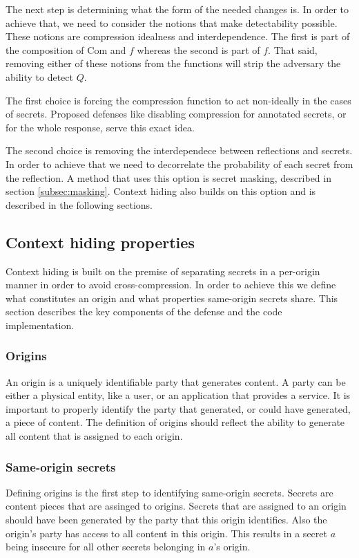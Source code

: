 \documentclass[conference, letterpaper, 10pt]{IEEEtran}
\begin{document}
The next step is determining what the form of the needed changes is. In order to
achieve that, we need to consider the notions that make detectability possible.
These notions are compression idealness and interdependence. The first is part
of the composition of $\textrm{Com}$ and $f$ whereas the second is part of $f$. That
said, removing either of these notions from the functions will strip the
adversary the ability to detect $Q$.

The first choice is forcing the compression function to act non-ideally in the
cases of secrets. Proposed defenses like disabling compression for annotated
secrets, or for the whole response, serve this exact idea.

The second choice is removing the interdependece between reflections and
secrets. In order to achieve that we need to decorrelate the probability of each
secret from the reflection. A method that uses this option is secret masking,
described in section \ref{subsec:masking}. Context hiding also builds on this
option and is described in the following sections.

\subsection{Context hiding properties}

Context hiding is built on the premise of separating secrets in a per-origin
manner in order to avoid cross-compression. In order to achieve this we define
what constitutes an origin and what properties same-origin secrets share. This
section describes the key components of the defense and the code implementation.

\subsubsection{Origins}
An origin is a uniquely identifiable party that generates content. A party can
be either a physical entity, like a user, or an application that provides a
service. It is important to properly identify the party that generated, or could
have generated, a piece of content. The definition of origins should reflect the
ability to generate all content that is assigned to each origin.

\subsubsection{Same-origin secrets}
Defining origins is the first step to identifying same-origin secrets. Secrets
are content pieces that are assinged to origins. Secrets that are assigned to an
origin should have been generated by the party that this origin identifies.
Also the origin's party has access to all content in this origin. This results
in a secret $a$ being insecure for all other secrets belonging in $a$'s origin.
\end{document}
